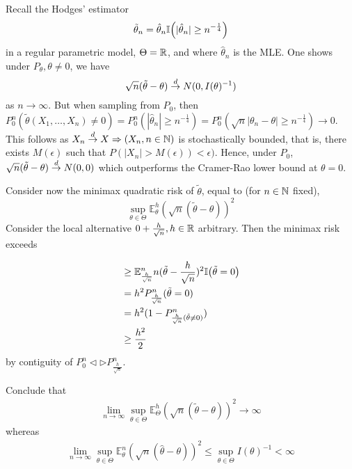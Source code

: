 \begin{exmp}
  \label{defn:parametric_statistical_models:12}
  Recall the Hodges' estimator
  \begin{equation}
    \label{eq:94}
    \tilde \theta_{n} = \hat \theta_{n} \I{|\hat \theta_{n}| \geq n^{-\frac{1}{4}}}
  \end{equation} in a regular parametric model, $\Theta = \mathbb{R}$, and
  where $\hat \theta_{n}$ is the MLE.  One shows under $P_{\theta},
  \theta \neq 0$, we have
  \begin{equation}
    \label{eq:95}
    \sqrt{n}(\tilde \theta - \theta) \overset{d}{\rightarrow} N(0, I(\theta)^{-1})
  \end{equation} as $n \rightarrow \infty$.  But when sampling from
  $P_{0}$, then $P_{0}^{n} (\tilde \theta(X_{1}, \dots, X_{n}) \neq 0)
  = P_{0}^{n}(|\hat \theta_{n}| \geq n^{-\frac{1}{4}}) =
  P_{0}^{n}(\sqrt{n}|\theta_{n} - \theta| \geq n^{-\frac{1}{4}})
  \rightarrow 0$.
  This follows as $X_{n} \overset{d}{\rightarrow} X \Rightarrow (X_{n}, n \in \mathbb{N})$  is
  stochastically bounded, that is, there exists $M(\epsilon)$ such
  that $P(|X_{n}| > M(\epsilon)) < \epsilon)$.  Hence, under $P_{0}$,
  $\sqrt{n}(\tilde \theta - \theta) \overset{d}{\rightarrow} N(0, 0)$ which outperforms the
  Cramer-Rao lower bound at $\theta = 0$.

  Consider now the minimax quadratic risk of $\tilde \theta$, equal to
  (for $n \in \mathbb{N}$ fixed),
  \begin{equation}
    \label{eq:96}
    \sup_{\theta \in \Theta} \mathbb{E}^{h}_{\theta} (\sqrt{n}(\tilde
    \theta - \theta))^{2}
  \end{equation} Consider the local alternative $0 +
  \frac{h}{\sqrt{n}}, h \in \mathbb{R}$ arbitrary.  Then the minimax risk
  exceeds

  \begin{align}
    \label{eq:97}
    &\geq \mathbb{E}^{n}_{\frac{h}{\sqrt{n}}} n(\tilde \theta -
    \frac{h}{\sqrt{n}})^{2} \I{\tilde \theta = 0} \\
    &= h^{2}P_{\frac{h}{\sqrt{n}}}^{n}(\tilde \theta = 0) \\
    &= h^{2}(1 - P^{n}_{\frac{h}{\sqrt{n}}(\tilde \theta \neq 0)}) \\
    &\geq \frac{h^{2}}{2}
  \end{align} by contiguity of $P_{0}^{n} \lhd \rhd P^{n}_{\frac{h}{\sqrt{n}}}$.

  Conclude that
  \begin{align}
    \label{eq:98}
    \lim_{n \rightarrow \infty} \sup_{\theta \in \Theta}
    \mathbb{E}_{\Theta}^{h}(\sqrt{n}(\tilde \theta - \theta))^{2}
    \rightarrow \infty 
  \end{align} whereas
  \begin{align}
    \label{eq:99}
    \lim_{n \rightarrow \infty} \sup_{\theta \in \Theta}
    \mathbb{E}^{n}_{\theta}(\sqrt{n}(\hat \theta - \theta))^{2} \leq
    \sup_{\theta \in \Theta} I(\theta)^{-1} < \infty
  \end{align}
\end{exmp}

